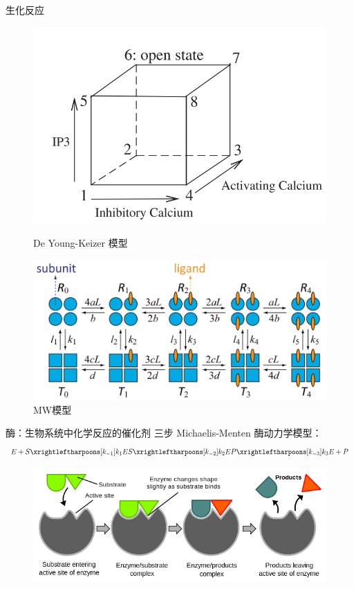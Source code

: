 \documentclass{beamer}
\begin{document}
\begin{frame}{生化反应}
	\begin{figure}[h]
		\begin{minipage}[t]{0.4\linewidth}
			\centering
			\includegraphics[scale=0.4]{chart/De-Young-Keizer-model.png}
			\caption{De Young-Keizer 模型}
		\end{minipage}
		\begin{minipage}[t]{0.4\linewidth}
			\centering
			\includegraphics[scale=0.4]{chart/MWC.png}
			\caption{MW模型}
		\end{minipage}
	\end{figure}
\end{frame}

\begin{frame} {酶：生物系统中化学反应的催化剂}
	三步 Michaelis-Menten 酶动力学模型：
	$$
		E + S \xrightleftharpoons[k_{-1}]{k_1}
		ES \xrightleftharpoons[k_{-2}]{k_2}
		EP \xrightleftharpoons[k_{-3}]{k_3}
		E + P
	$$
	\begin{figure}[h]
		\centering
		\includegraphics[scale=0.4]{chart/enzyme.png}
	\end{figure}
\end{frame}
\end{document}
